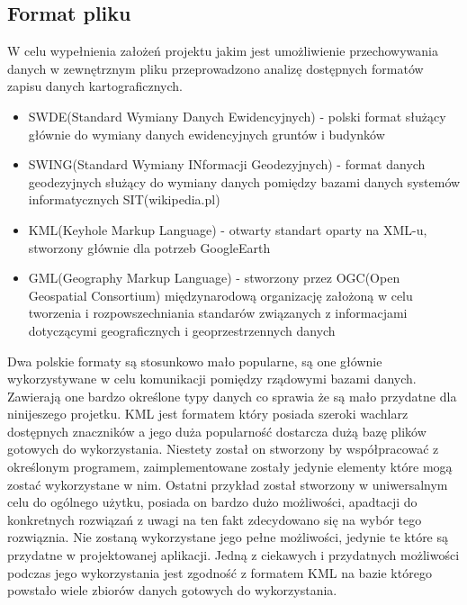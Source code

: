 \subsection{Format pliku}
\label{subsec:fileformat}

W celu wypełnienia założeń projektu jakim jest umożliwienie przechowywania danych w zewnętrznym pliku przeprowadzono analizę dostępnych formatów zapisu danych kartograficznych.

\begin{itemize}

\item
SWDE(Standard Wymiany Danych Ewidencyjnych) - polski format służący głównie do wymiany danych ewidencyjnych gruntów i budynków

\item
SWING(Standard Wymiany INformacji Geodezyjnych) - format danych geodezyjnych służący do wymiany danych pomiędzy bazami danych systemów informatycznych SIT(wikipedia.pl)

\item
KML(Keyhole Markup Language) - otwarty standart oparty na XML-u, stworzony głównie dla potrzeb GoogleEarth

\item
GML(Geography Markup Language) - stworzony przez OGC(Open Geospatial Consortium) międzynarodową organizację założoną w celu tworzenia i rozpowszechniania standarów związanych z informacjami dotyczącymi geograficznych i geoprzestrzennych danych

\end{itemize}

Dwa polskie formaty są stosunkowo mało popularne, są one głównie wykorzystywane w celu komunikacji pomiędzy rządowymi bazami danych. Zawierają one bardzo określone typy danych co sprawia że są mało przydatne dla ninijeszego projetku. KML jest formatem który posiada szeroki wachlarz dostępnych znaczników a jego duża popularność dostarcza dużą bazę plików gotowych do wykorzystania. Niestety został on stworzony by współpracować z określonym programem, zaimplementowane zostały jedynie elementy które mogą zostać wykorzystane w nim. Ostatni przykład został stworzony w uniwersalnym celu do ogólnego użytku, posiada on bardzo dużo możliwości, apadtacji do konkretnych rozwiązań\cite{gml} z uwagi na ten fakt zdecydowano się na wybór tego rozwiąznia. Nie zostaną wykorzystane jego pełne możliwości, jedynie te które są przydatne w projektowanej aplikacji.
Jedną z ciekawych i przydatnych możliwości podczas jego wykorzystania jest zgodność z formatem KML na bazie którego powstało wiele zbiorów danych gotowych do wykorzystania.


